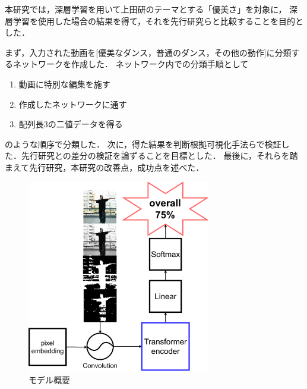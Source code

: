 本研究では，深層学習を用いて上田研のテーマとする「優美さ」を対象に，
深層学習を使用した場合の結果を得て，それを先行研究らと比較することを目的とした．

まず，入力された動画を[優美なダンス，普通のダンス，その他の動作]に分類するネットワークを作成した．
ネットワーク内での分類手順として
\begin{enumerate}
  \item 動画に特別な編集を施す
  \item 作成したネットワークに通す
  \item 配列長3の二値データを得る
\end{enumerate}
のような順序で分類した．
次に，得た結果を判断根拠可視化手法らで検証した．先行研究との差分の検証を論ずることを目標とした．
最後に，それらを踏まえて先行研究，本研究の改善点，成功点を述べた．

\begin{figure}[b]
  \begin{center}
    \includegraphics[width=80mm]{images/chart/easy_chart.pdf}
  \end{center}
  \caption{モデル概要}
  \label{easy_chart}
\end{figure}